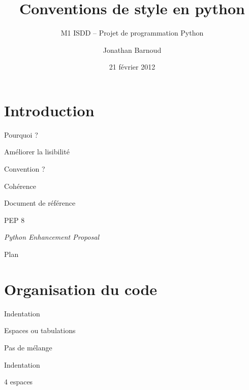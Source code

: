 \documentclass[xcolor=pdftex,dvipsnames,table,handout]{beamer}
\title{Conventions de style en python}
\subtitle{M1 ISDD -- Projet de programmation Python}
\author{Jonathan Barnoud}
\date{21 février 2012}
\begin{document}
\titleframe{}

\section*{Introduction}

\begin{frame}{Pourquoi ?}
\begin{center}
\Huge{Améliorer la lisibilité}
\end{center}
\end{frame}

\begin{frame}{Convention ?}
\begin{center}
\Huge{Cohérence}
\vspace{1cm}

\Large{}
\end{center}
\end{frame}

\begin{frame}{Document de référence}
\begin{center}
\Huge{PEP 8}
\vspace{1cm}

\Large{\textit{Python Enhancement Proposal}}
\end{center}
\end{frame}


\begin{frame}{Plan}
\tableofcontents
\end{frame}

\section{Organisation du code}

\begin{frame}{Indentation}
\begin{center}
\Large{Espaces ou tabulations}
\vspace{2cm}

\Large{Pas de mélange}
\end{center}
\end{frame}

\begin{frame}{Indentation}
\begin{center}
\Huge{4 espaces}
\end{center}
\end{frame}
\end{document}
